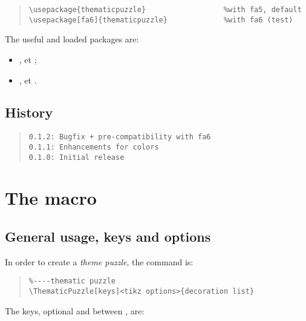 \documentclass[11pt,a4paper]{ltxdoc}
\begin{document}
\begin{quote}
\begin{verbatim}
\usepackage{thematicpuzzle}                  %with fa5, default
\usepackage[fa6]{thematicpuzzle}             %with fa6 (test)
\end{verbatim}
\end{quote}

The useful and loaded packages are:

\begin{itemize}
	\item {},  et  ;
	\item {},  et .
\end{itemize}

\vfill

\subsection{History}

\begin{quote}
\begin{verbatim}
0.1.2: Bugfix + pre-compatibility with fa6
0.1.1: Enhancements for colors
0.1.0: Initial release
\end{verbatim}
\end{quote}

\pagebreak

\section{The macro}

\subsection{General usage, keys and options}

In order to create a \textit{theme puzzle}, the command is:

\begin{quote}
\begin{verbatim}
%----thematic puzzle
\ThematicPuzzle[keys]<tikz options>{decoration list}
\end{verbatim}
\end{quote}

The \textsf{keys}, optional and between \MontreCode{[...]}, are:
\end{document}
